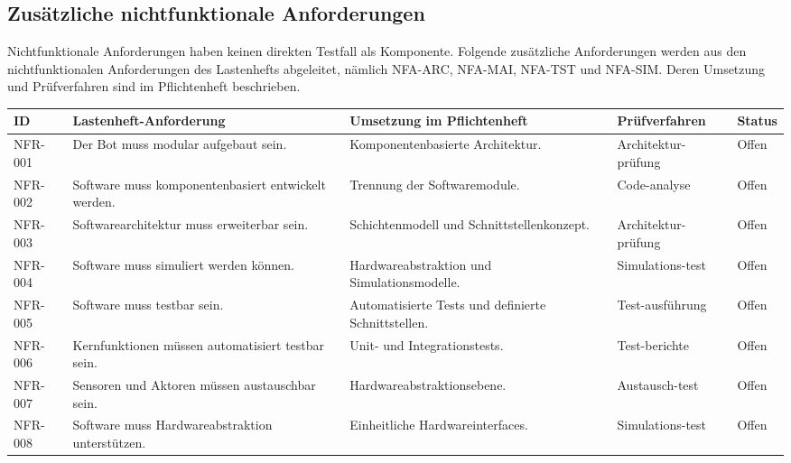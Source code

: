 \subsection{Zusätzliche nichtfunktionale
Anforderungen}\label{zusuxe4tzliche-nichtfunktionale-anforderungen}

Nichtfunktionale Anforderungen haben keinen direkten Testfall als
Komponente. Folgende zusätzliche Anforderungen werden aus den
nichtfunktionalen Anforderungen des Lastenhefts abgeleitet, nämlich
NFA-ARC, NFA-MAI, NFA-TST und NFA-SIM. Deren Umsetzung und Prüfverfahren
sind im Pflichtenheft beschrieben.

\begin{longtable}[]{@{}
  >{\raggedright\arraybackslash}p{}
  >{\raggedright\arraybackslash}p{}
  >{\raggedright\arraybackslash}p{}
  >{\raggedright\arraybackslash}p{}
  >{\raggedleft\arraybackslash}p{}@{}}
\toprule\noalign{}
\begin{minipage}[b]{\linewidth}\raggedright
ID
\end{minipage} & \begin{minipage}[b]{\linewidth}\raggedright
Lastenheft-Anforderung
\end{minipage} & \begin{minipage}[b]{\linewidth}\raggedright
Umsetzung im Pflichtenheft
\end{minipage} & \begin{minipage}[b]{\linewidth}\raggedright
Prüfverfahren
\end{minipage} & \begin{minipage}[b]{\linewidth}\raggedleft
Status
\end{minipage} \\
\midrule\noalign{}
\endhead
\bottomrule\noalign{}
\endlastfoot
NFR-001 & Der Bot muss modular aufgebaut sein. & Komponentenbasierte
Architektur. & Architektur-prüfung & Offen \\
NFR-002 & Software muss komponentenbasiert entwickelt werden. & Trennung
der Softwaremodule. & Code-analyse & Offen \\
NFR-003 & Softwarearchitektur muss erweiterbar sein. & Schichtenmodell
und Schnittstellenkonzept. & Architektur-prüfung & Offen \\
NFR-004 & Software muss simuliert werden können. & Hardwareabstraktion
und Simulationsmodelle. & Simulations-test & Offen \\
NFR-005 & Software muss testbar sein. & Automatisierte Tests und
definierte Schnittstellen. & Test-ausführung & Offen \\
NFR-006 & Kernfunktionen müssen automatisiert testbar sein. & Unit- und
Integrationstests. & Test-berichte & Offen \\
NFR-007 & Sensoren und Aktoren müssen austauschbar sein. &
Hardwareabstraktionsebene. & Austausch-test & Offen \\
NFR-008 & Software muss Hardwareabstraktion unterstützen. & Einheitliche
Hardwareinterfaces. & Simulations-test & Offen \\
\end{longtable}

